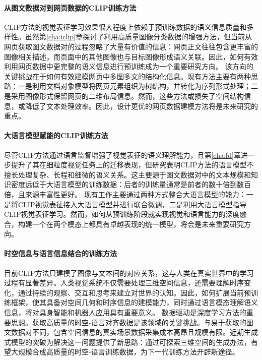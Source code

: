 \paragraph{从图文数据对到网页数据的CLIP训练方法}
CLIP方法的视觉表征学习效果很大程度上依赖于预训练数据的语义信息质量和多样性。虽然第\ref{cha:iclip}章探讨了利用高质量图像分类数据的增强方法，但当前从网页获取图文数据对的过程忽略了大量有价值的信息：网页正文往往包含更丰富的图像相关描述，而页面中的其他图像也与目标图像形成语义关联。因此，如何有效利用网页数据中更完整的语义信息进行预训练\cite{S4, NEURIPS2024_2a952768}成为一个重要研究方向。
该方向的关键挑战在于如何有效建模网页中多图多文的结构化信息。现有方法主要有两种思路：一是利用文档对象模型将网页元素组织为树结构，并转化为序列形式处理\cite{DomLM,layoutlm}；二是采用图像形式保留网页的二维布局信息\cite{CLIPPO}。然而，这些方法或损失了空间结构信息，或降低了文本处理效率。因此，设计更优的网页数据建模方法将是未来研究的重点。

\paragraph{大语言模型赋能的CLIP训练方法}
尽管CLIP方法通过语言监督增强了视觉表征的语义理解能力，且第\ref{cha:fd}章进一步提升了其在细粒度视觉任务上的迁移表现，但研究表明\cite{bow,CLIPA}CLIP方法的语言模型不擅长处理复杂、长程和细微的语义关系。这主要源于图文数据对中的文本规模和知识密度远低于大语言模型的训练数据：后者的训练量通常是前者的数十倍到数百倍\cite{gpt4, dsv3, radford2021learning}，且来源丰富性更好。
现有工作主要通过两种方式整合大语言模型的能力：一是将CLIP视觉表征接入大语言模型并进行联合微调\cite{blip-2, llava}，二是利用大语言模型指导CLIP视觉表征学习\cite{LLM2CLIP}。然而，如何从预训练阶段就实现视觉和语言能力的深度融合，构建一个在两个模态上都具有卓越表现的统一模型\cite{gemini}，将会是未来重要研究方向。

\paragraph{时空信息与语言信息结合的训练方法}
目前CLIP方法只建模了图像与文本间的对应关系，这与人类在真实世界中的学习过程有显著差异。人类视觉系统不仅需要处理三维空间信息，还需要理解时序变化，通过持续的观察、交互和思考来建立对世界的认知。因此，如何扩展当前预训练框架，使其具备对空间几何和时序信息的建模能力，同时通过语言模态理解语义信息，将对具身智能和机器人应用具有重要意义。
数据驱动是深度学习方法的重要思想。获取高质量的时空-语言对齐数据是该领域的关键挑战。与易于获取的图文数据对不同，包含空间信息的真实场景数据采集成本高昂且规模有限。近期生成式模型的突破\cite{latentdiff,veo2}为解决这一问题提供了新思路：通过可探索三维空间的生成办法\cite{genex, genie2}，有望大规模合成高质量的时空-语言训练数据，为下一代训练方法开辟新途径。

